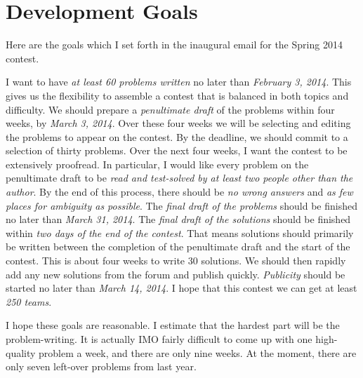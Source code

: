 \documentclass[11pt]{scrreprt}
\begin{document}
\section{Development Goals}
Here are the goals which I set forth in the inaugural email for the Spring 2014 contest.
\begin{enumerate}
  \ii I want to have \emph{at least 60 problems written} no later than \emph{February 3, 2014}. This gives us the flexibility to assemble a contest that is balanced in both topics and difficulty.
  \ii We should prepare a \emph{penultimate draft} of the problems within four weeks, by \emph{March 3, 2014}. Over these four weeks we will be selecting and editing the problems to appear on the contest. By the deadline, we should commit to a selection of thirty problems.
  \ii Over the next four weeks, I want the contest to be extensively proofread. In particular, I would like every problem on the penultimate draft to be \emph{read and test-solved by at least two people other than the author}. By the end of this process, there should be \emph{no wrong answers} and \emph{as few places for ambiguity as possible}.
  \ii The \emph{final draft of the problems} should be finished no later than \emph{March 31, 2014}.
  \ii The \emph{final draft of the solutions} should be finished within \emph{two days of the end of the contest}. That means solutions should primarily be written between the completion of the penultimate draft and the start of the contest. This is about four weeks to write 30 solutions. We should then rapidly add any new solutions from the forum and publish quickly.
  \ii \emph{Publicity} should be started no later than \emph{March 14, 2014}. I hope that this contest we can get at least \emph{250 teams}.
\end{enumerate}
I hope these goals are reasonable. I estimate that the hardest part will be the problem-writing. It is actually IMO fairly difficult to come up with one high-quality problem a week, and there are only nine weeks. At the moment, there are only seven left-over problems from last year.
\end{document}

